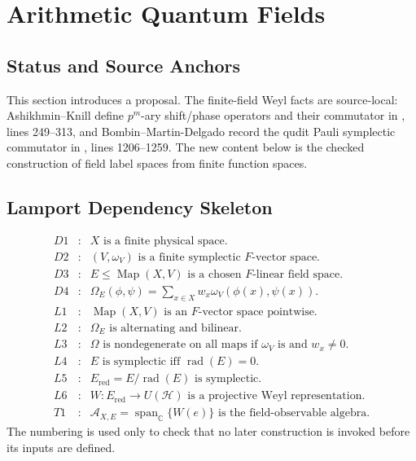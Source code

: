 
\section{Arithmetic Quantum Fields}
\label{sec:arithmetic-quantum-fields}

\subsection{Status and Source Anchors}

This section introduces a proposal.  The finite-field Weyl facts are
source-local: Ashikhmin--Knill define \(p^m\)-ary shift/phase operators and
their commutator in , lines 249--313, and
Bombin--Martin-Delgado record the qudit Pauli symplectic commutator in
, lines 1206--1259.  The new content
below is the checked construction of field label spaces from finite function
spaces.

\subsection{Lamport Dependency Skeleton}

\[
\begin{array}{rcl}
D1&:&X\text{ is a finite physical space.}\\
D2&:&(V,\omega_V)\text{ is a finite symplectic }F\text{-vector space.}\\
D3&:&E\leq \operatorname{Map}(X,V)\text{ is a chosen }F\text{-linear field space.}\\
D4&:&\Omega_E(\phi,\psi)=\sum_{x\in X}w_x\omega_V(\phi(x),\psi(x)).\\
L1&:&\operatorname{Map}(X,V)\text{ is an }F\text{-vector space pointwise.}\\
L2&:&\Omega_E\text{ is alternating and bilinear.}\\
L3&:&\Omega\text{ is nondegenerate on all maps if }\omega_V\text{ is and }w_x\ne0.\\
L4&:&E\text{ is symplectic iff }\operatorname{rad}(E)=0.\\
L5&:&E_{\mathrm{red}}=E/\operatorname{rad}(E)\text{ is symplectic.}\\
L6&:&W:E_{\mathrm{red}}\to U(\mathcal H)\text{ is a projective Weyl representation.}\\
T1&:&\mathcal A_{X,E}=\operatorname{span}_{\mathbb C}\{W(e)\}\text{ is the field-observable algebra.}
\end{array}
\]
The numbering is used only to check that no later construction is invoked
before its inputs are defined.

